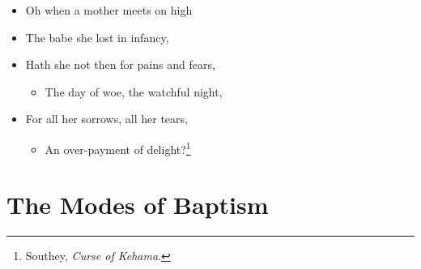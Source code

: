 \documentclass[
  english,
]{book}
\providecommand{\tightlist}{%
  \setlength{\itemsep}{0pt}\setlength{\parskip}{0pt}}
\begin{document}
\begin{itemize}
\item
  Oh when a mother meets on high\\
\item
  The babe she lost in infancy,
\item
  Hath she not then for pains and fears,

  \begin{itemize}
  \tightlist
  \item
    The day of woe, the watchful night,
  \end{itemize}
\item
  For all her sorrows, all her tears,

  \begin{itemize}
  \tightlist
  \item
    An over-payment of delight?\footnote{Southey, \emph{Curse of Kehama}.}
  \end{itemize}
\end{itemize}

\hypertarget{the-modes-of-baptism}{%
\section{The Modes of Baptism}\label{the-modes-of-baptism}}
\end{document}
